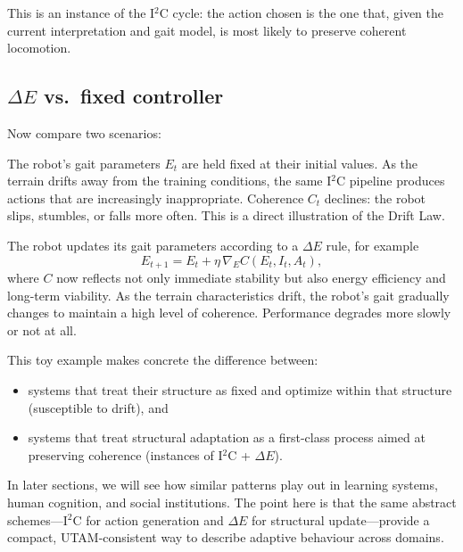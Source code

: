 \documentclass[12pt,a4paper]{report}
\begin{document}
This is an instance of the I$^2$C cycle: the action chosen is the one that, given the current interpretation and gait model, is most likely to preserve coherent locomotion.

\subsection*{$\Delta E$ vs.\ fixed controller}

Now compare two scenarios:

\begin{description}[leftmargin=2em]
    \item[Fixed controller (no $\Delta E$).] The robot's gait parameters \(E_t\) are held fixed at their initial values. As the terrain drifts away from the training conditions, the same I$^2$C pipeline produces actions that are increasingly inappropriate. Coherence \(C_t\) declines: the robot slips, stumbles, or falls more often. This is a direct illustration of the Drift Law.
    \item[Adaptive controller ($\Delta E$ active).] The robot updates its gait parameters according to a $\Delta E$ rule, for example
    \[
        E_{t+1} = E_t + \eta \, \nabla_E C(E_t, I_t, A_t),
    \]
    where \(C\) now reflects not only immediate stability but also energy efficiency and long-term viability. As the terrain characteristics drift, the robot's gait gradually changes to maintain a high level of coherence. Performance degrades more slowly or not at all.
\end{description}

This toy example makes concrete the difference between:

\begin{itemize}[leftmargin=2em]
    \item systems that treat their structure as fixed and optimize within that structure (susceptible to drift), and
    \item systems that treat structural adaptation as a first-class process aimed at preserving coherence (instances of I$^2$C + $\Delta E$).
\end{itemize}

In later sections, we will see how similar patterns play out in learning systems, human cognition, and social institutions. The point here is that the same abstract schemes---I$^2$C for action generation and $\Delta E$ for structural update---provide a compact, UTAM-consistent way to describe adaptive behaviour across domains.
\end{document}
